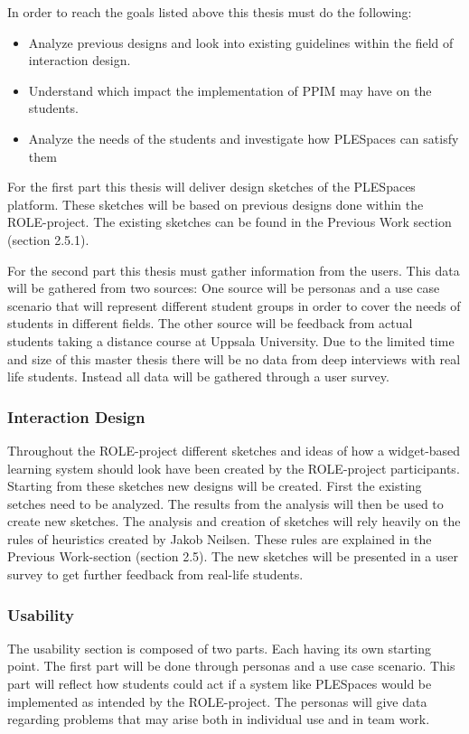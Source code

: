 In order to reach the goals listed above this thesis must do the following:
\begin {itemize}
	\item Analyze previous designs and look into existing guidelines within the field of interaction design.
	\item Understand which impact the implementation of PPIM may have on the students.
	\item Analyze the needs of the students and investigate how PLESpaces can satisfy them
\end {itemize}

For the first part this thesis will deliver design sketches of the PLESpaces platform. These sketches will be based on previous designs done within the ROLE-project. The existing sketches can be found in the Previous Work section (section 2.5.1).

For the second part this thesis must gather information from the users. This data will be gathered from two sources: One source will be personas and a use case scenario that will represent different student groups in order to cover the needs of students in different fields. The other source will be feedback from actual students taking a distance course at Uppsala University. Due to the limited time and size of this master thesis there will be no data from deep interviews with real life students. Instead all data will be gathered through a user survey.

\subsubsection {Interaction Design}
Throughout the ROLE-project different sketches and ideas of how a widget-based learning system should look have been created by the ROLE-project participants. Starting from these sketches new designs will be created. First the existing setches need to be analyzed. The results from the analysis will then be used to create new sketches. The analysis and creation of sketches will rely heavily on the rules of heuristics created by Jakob Neilsen. These rules are explained in the Previous Work-section (section 2.5). The new sketches will be presented in a user survey to get further feedback from real-life students.

\subsubsection {Usability}
The usability section is composed of two parts. Each having its own starting point. The first part will be done through personas and a use case scenario. This part will reflect how students could act if a system like PLESpaces would be implemented as intended by the ROLE-project. The personas will give data regarding problems that may arise both in individual use and in team work.


